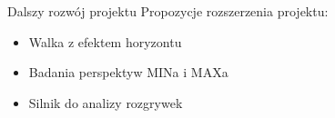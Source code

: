 \begin{frame}{Dalszy rozwój projektu}
    Propozycje rozszerzenia projektu:
    \begin{itemize}
        \item Walka z efektem horyzontu
        \item Badania perspektyw MINa i MAXa
        \item Silnik do analizy rozgrywek
    \end{itemize}





\end{frame}
